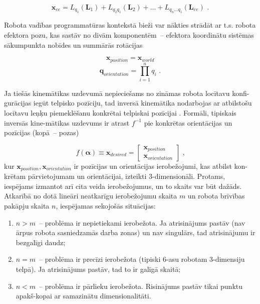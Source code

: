 \documentclass[12pt, a4paper]{article}
\numberwithin{equation}{section} %
\begin{document}
\begin{equation}
    \boldsymbol{x}_{ee} = L_{q_1}(\boldsymbol{L}_1) + L_{q_2q_1}(\boldsymbol{L}_2) + ... + L_{q_n...q_1}(\boldsymbol{L}_{ee})
\text{ .}
\end{equation}

Robota vadības programmatūras kontekstā bieži var nākties strādāt ar t.s. robota efektora pozu, kas sastāv no divām komponentēm~-- efektora koordinātu sistēmas sākumpunkta nobīdes un summārās rotācijas

\begin{equation}
    \boldsymbol{x}_{position} = \boldsymbol{x}_{world}
\end{equation}
\begin{equation}
    \boldsymbol{q}_{orientation} = \prod_{i=1}^n q_i
\text{ .}
\end{equation}

Ja tiešās kinemātikas uzdevumā nepieciešams no zināmas robota locītavu konfi-gurācijas iegūt telpisko pozīciju, tad inversā kinemātika nodarbojas ar atbilstošu locītavu leņķu piemeklēšanu konkrētai telpiskai pozīcijai \cite{inverse_kinematics_illinois}. Formāli, tipiskais inversās kine-mātikas uzdevums ir atrast $f^{-1}$ pie konkrētas orientācijas un pozīcijas (kopā~-- pozas)

\begin{equation}
    f(\boldsymbol{\alpha}) \equiv \boldsymbol{x}_{desired} = 
    \begin{bmatrix}
        \boldsymbol{x}_{position} \\
        \boldsymbol{x}_{orientation} 
    \end{bmatrix}
\text{ ,}
\end{equation}
kur $\boldsymbol{x}_{position}, \boldsymbol{x}_{orientation}$ ir pozīcijas un orientācijas ierobežojumi, kas atbilst kon-krētam pārvietojumam un orientācijai, izteikti 3-dimensionāli. Protams, iespējams izmantot arī cita veida ierobežojumus, un to skaits var būt dažāds. Atkarībā no dotā lineāri neatkarīgu ierobežojumu skaita $m$ un robota brīvības pakāpju skaita $n$, iespējamas sekojošās situācijas:

\begin{enumerate}
    \item $n > m$~-- problēma ir nepietiekami ierobežota. Ja atrisinājums pastāv (nav ārpus robota sasniedzamās darba zonas) un nav singulārs, tad atrisinājumu ir bezgalīgi daudz;
    \item $n = m$~-- problēma ir precīzi ierobežota  (tipiski 6-asu robotam 3-dimensiju telpā). Ja atrisinājums pastāv, tad to ir galīgā skaitā;
    \item $n < m$~-- problēma ir pārlieku ierobežota. Risinājums pastāv tikai punktu apakš-kopai ar samazinātu dimensionalitāti.
\end{enumerate}
\end{document}

